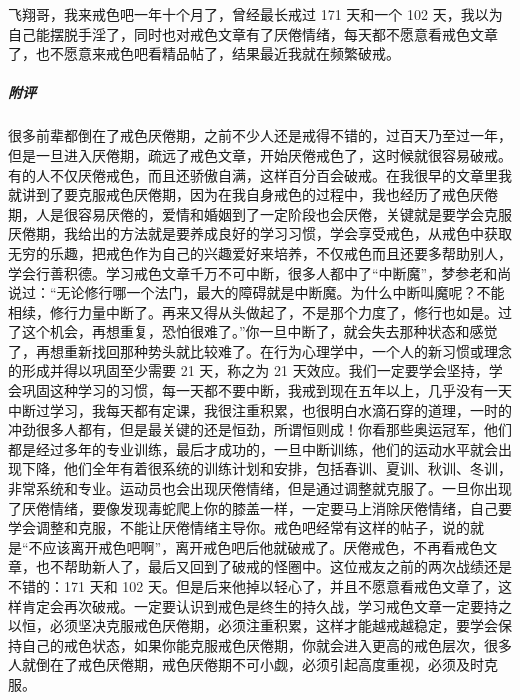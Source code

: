 \begin{case}
    飞翔哥，我来戒色吧一年十个月了，曾经最长戒过 171 天和一个 102 天，我以为自己能摆脱手淫了，同时也对戒色文章有了厌倦情绪，每天都不愿意看戒色文章了，也不愿意来戒色吧看精品帖了，结果最近我就在频繁破戒。
    \subparagraph{附评} 很多前辈都倒在了戒色厌倦期，之前不少人还是戒得不错的，过百天乃至过一年，但是一旦进入厌倦期，疏远了戒色文章，开始厌倦戒色了，这时候就很容易破戒。有的人不仅厌倦戒色，而且还骄傲自满，这样百分百会破戒。在我很早的文章里我就讲到了要克服戒色厌倦期，因为在我自身戒色的过程中，我也经历了戒色厌倦期，人是很容易厌倦的，爱情和婚姻到了一定阶段也会厌倦，关键就是要学会克服厌倦期，我给出的方法就是要养成良好的学习习惯，学会享受戒色，从戒色中获取无穷的乐趣，把戒色作为自己的兴趣爱好来培养，不仅戒色而且还要多帮助别人，学会行善积德。学习戒色文章千万不可中断，很多人都中了“中断魔”，梦参老和尚说过：“无论修行哪一个法门，最大的障碍就是中断魔。为什么中断叫魔呢？不能相续，修行力量中断了。再来又得从头做起了，不是那个力度了，修行也如是。过了这个机会，再想重复，恐怕很难了。”你一旦中断了，就会失去那种状态和感觉了，再想重新找回那种势头就比较难了。在行为心理学中，一个人的新习惯或理念的形成并得以巩固至少需要 21 天，称之为 21 天效应。我们一定要学会坚持，学会巩固这种学习的习惯，每一天都不要中断，我戒到现在五年以上，几乎没有一天中断过学习，我每天都有定课，我很注重积累，也很明白水滴石穿的道理，一时的冲劲很多人都有，但是最关键的还是恒劲，所谓恒则成！你看那些奥运冠军，他们都是经过多年的专业训练，最后才成功的，一旦中断训练，他们的运动水平就会出现下降，他们全年有着很系统的训练计划和安排，包括春训、夏训、秋训、冬训，非常系统和专业。运动员也会出现厌倦情绪，但是通过调整就克服了。一旦你出现了厌倦情绪，要像发现毒蛇爬上你的膝盖一样，一定要马上消除厌倦情绪，自己要学会调整和克服，不能让厌倦情绪主导你。戒色吧经常有这样的帖子，说的就是“不应该离开戒色吧啊”，离开戒色吧后他就破戒了。厌倦戒色，不再看戒色文章，也不帮助新人了，最后又回到了破戒的怪圈中。这位戒友之前的两次战绩还是不错的：171 天和 102 天。但是后来他掉以轻心了，并且不愿意看戒色文章了，这样肯定会再次破戒。一定要认识到戒色是终生的持久战，学习戒色文章一定要持之以恒，必须坚决克服戒色厌倦期，必须注重积累，这样才能越戒越稳定，要学会保持自己的戒色状态，如果你能克服戒色厌倦期，你就会进入更高的戒色层次，很多人就倒在了戒色厌倦期，戒色厌倦期不可小觑，必须引起高度重视，必须及时克服。
\end{case}

